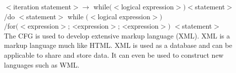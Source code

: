 \documentclass[a4]{article}
\begin{document}
\vspace*{0.2cm}
\hspace*{1cm} $<$iteration statement$> \rightarrow$ while$(<$logical expression$>) <$statement$>$ \\
\hspace*{2.2cm} $/$do $<$statement$>$ while $(<$logical expression$>)$ \\
\hspace*{2.2cm} $/$for$(<$expression$>$; <expression$>$; <expression$>)$ $<$statement$>$ \\

\vspace*{0.2cm}
\hspace*{0.5cm} The CFG is used to develop extensive markup language (XML). XML is a markup language much
like HTML. XML is used as a database and can be applicable to share and store data. It can even be used
to construct new languages such as WML.\\
\end{document}
